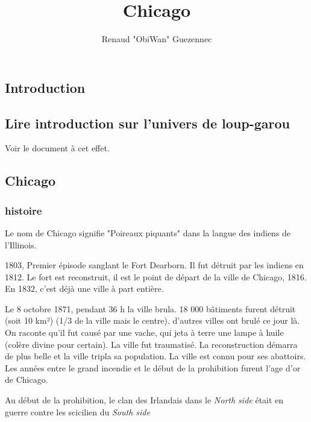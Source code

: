 \documentclass[oneside,12pt]{book}
\title{Chicago}
\author{Renaud "ObiWan" Guezennec}
\date{}
\begin{document}
\maketitle \clearpage
\tableofcontents \clearpage

\begin{flushleft}
    \chapter{Introduction}
        \section{Lire introduction sur l'univers de loup-garou}
       Voir le document à cet effet. 
         
       \section{Chicago} 
\subsection {histoire}
	Le nom de Chicago signifie "Poireaux piquants" dans la langue des indiens de l'Illinois.

1803, Premier épisode sanglant le Fort Dearborn. Il fut détruit par les indiens en 1812. Le fort est reconstruit, il est le point de départ de la ville de Chicago, 1816.
En 1832, c'est déjà une ville à part entière.

Le 8 octobre 1871, pendant 36 h la ville brula. 18 000 bâtiments furent détruit (soit 10 km²) (1/3 de la ville mais le centre). 
d'autres villes ont brulé ce jour là. 
On raconte qu'il fut causé par une vache, qui jeta à terre une lampe à huile (colère divine pour certain).
La ville fut traumatisé.
La reconstruction démarra de plus belle et la ville tripla sa population. 
La ville est connu pour ses abattoirs.
Les années entre le grand incendie et le début de la prohibition furent l'age d'or de Chicago.

Au début de la prohibition, le clan des Irlandais dans le \textit{North side} était en guerre contre les scicilien du \textit{South side}


\end{flushleft}
\end{document}
